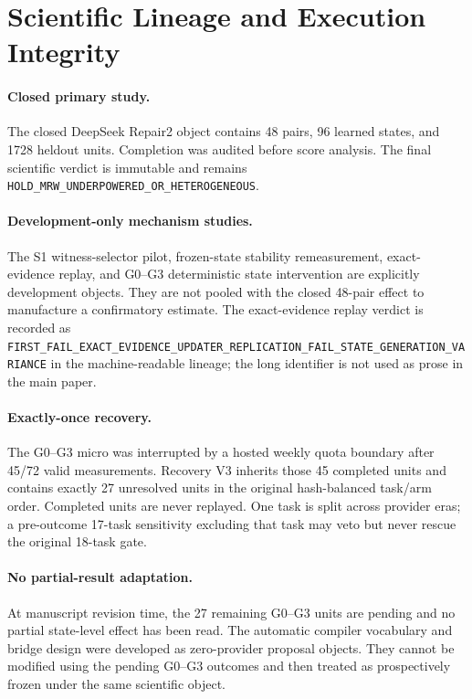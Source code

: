 \section{Scientific Lineage and Execution Integrity}
\label{app:integrity}

\paragraph{Closed primary study.}
The closed DeepSeek Repair2 object contains 48 pairs, 96 learned states, and 1728 heldout units. Completion was audited before score analysis. The final scientific verdict is immutable and remains \texttt{HOLD\_MRW\_UNDERPOWERED\_OR\_HETEROGENEOUS}.

\paragraph{Development-only mechanism studies.}
The S1 witness-selector pilot, frozen-state stability remeasurement, exact-evidence replay, and G0--G3 deterministic state intervention are explicitly development objects. They are not pooled with the closed 48-pair effect to manufacture a confirmatory estimate. The exact-evidence replay verdict is recorded as \nolinkurl{FIRST_FAIL_EXACT_EVIDENCE_UPDATER_REPLICATION_FAIL_STATE_GENERATION_VARIANCE} in the machine-readable lineage; the long identifier is not used as prose in the main paper.

\paragraph{Exactly-once recovery.}
The G0--G3 micro was interrupted by a hosted weekly quota boundary after 45/72 valid measurements. Recovery V3 inherits those 45 completed units and contains exactly 27 unresolved units in the original hash-balanced task/arm order. Completed units are never replayed. One task is split across provider eras; a pre-outcome 17-task sensitivity excluding that task may veto but never rescue the original 18-task gate.

\paragraph{No partial-result adaptation.}
At manuscript revision time, the 27 remaining G0--G3 units are pending and no partial state-level effect has been read. The automatic compiler vocabulary and bridge design were developed as zero-provider proposal objects. They cannot be modified using the pending G0--G3 outcomes and then treated as prospectively frozen under the same scientific object.

